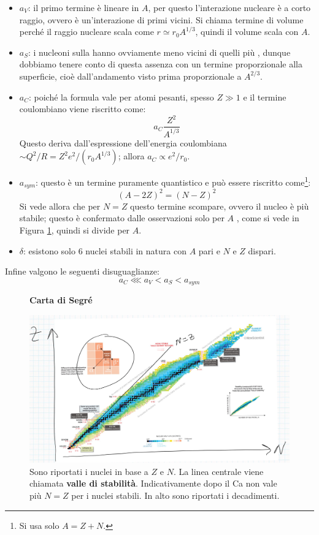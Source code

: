 \begin{itemize}
    \item $a_V$: il primo termine è lineare in $A$, per questo l'interazione nucleare è a corto raggio, ovvero è un'interazione di primi vicini. Si chiama termine di volume perché il raggio nucleare scala come $r\simeq r_0 A^{1/3}$, quindi il volume scala con $A$.
    \item $a_S$: i nucleoni sulla  hanno ovviamente meno vicini di quelli più , dunque dobbiamo tenere conto di questa assenza con un termine proporzionale alla superficie, cioè dall'andamento visto prima proporzionale a $A^{2/3}$.
    \item $a_C$: poiché la formula vale per atomi pesanti, spesso $Z\gg 1$ e il termine coulombiano viene riscritto come:
    $$a_C \frac{Z^2}{A^{1/3}}$$
    Questo deriva dall'espressione dell'energia coulombiana $\sim Q^2/R = Z^2 e^2 / (r_0A^{1/3})$; allora $a_C \propto e^2/r_0$.
    \item $a_{sym}$: questo è un termine puramente quantistico e può essere riscritto come\footnote{Si usa solo $A=Z+N$.}:
    $$(A-2Z)^2 = (N-Z)^2$$
    Si vede allora che per $N=Z$ questo termine scompare, ovvero il nucleo è più stabile; questo è confermato dalle osservazioni solo per $A$ , come si vede in Figura \ref{segre}, quindi si divide per $A$.
    \item $\delta$: esistono solo 6 nuclei stabili in natura con $A$ pari e $N$ e $Z$ dispari.
\end{itemize}
\noindent Infine valgono le seguenti disuguaglianze:
$$a_C \lll a_V <a_S < a_{sym}$$

\begin{figure}[h]
    \centering
    \textbf{\Large Carta di Segré}\par\medskip
    \includegraphics[scale=0.21]{Immagini/Segre.png}
    \caption{Sono riportati i nuclei in base a $Z$ e $N$. La linea centrale viene chiamata \textbf{valle di stabilità}. Indicativamente dopo il Ca non vale più $N=Z$ per i nuclei stabili. In alto sono riportati i decadimenti.}
    \label{segre}
\end{figure}

